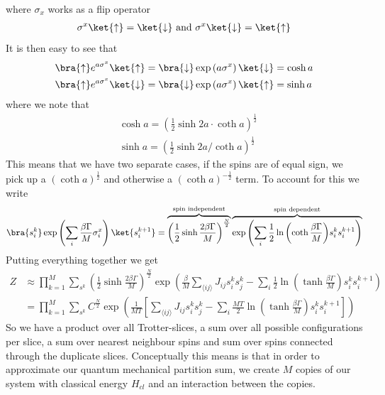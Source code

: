 where $\sigma_x$ works as a flip operator
\begin{align*}
    \sigma^x \ket{\uparrow} = \ket{\downarrow} \text{ and }
    \sigma^x \ket{\downarrow} = \ket{\uparrow}
\end{align*}
It is then easy to see that
\begin{align*}
    &\bra{\uparrow} e^{a\sigma^x} \ket{\uparrow} = \bra{\downarrow} \exp\left({a\sigma^x}\right) \ket{\downarrow} = \cosh{a} \\
    &\bra{\uparrow} e^{a\sigma^x} \ket{\downarrow} = \bra{\downarrow} \exp\left({a\sigma^x}\right) \ket{\uparrow} = \sinh{a}
\end{align*}
where we note that
\begin{align*}
    &\cosh{a} = \left(\frac{1}{2} \sinh{2a} \cdot \coth{a}\right)^{\frac{1}{2}}\\
    &\sinh{a} =  \left(\frac{1}{2} \sinh{2a} / \coth{a}\right)^{\frac{1}{2}}
\end{align*}
This means that we have two separate cases, if the spins are of equal sign, we pick up a $\left(\coth{a}\right)^{\frac{1}{2}}$ and otherwise a $\left(\coth{a}\right)^{-\frac{1}{2}}$ term. To account for this we write
\begin{eqnarray*}
    \bra{s^k_i} \exp\left(\sum_i \frac{\beta\Gamma}{M}\sigma_i^x\right) \ket{s^{k+1}_i} = \overbrace{\left(\frac{1}{2} \sinh{\frac{2\beta\Gamma}{M}}\right)^{\frac{N}{2}}}^{\text{spin independent}} \overbrace{\exp\left(\sum_i \frac{1}{2}\ln{\left(\coth{\frac{\beta\Gamma}{M}}\right)}s_i^k s_i^{k+1}\right)}^{\text{spin dependent}}
\end{eqnarray*}
Putting everything together we get 
\begin{align}
    Z &\approx \prod_{k=1}^M \sum_{s^k} \left(\frac{1}{2} \sinh{\frac{2\beta\Gamma}{M}}\right)^{\frac{N}{2}} \exp\left(\frac{\beta}{M}\sum_{\langle ij \rangle} J_{ij} s_i^k s_j^k - \sum_i\frac{1}{2}\ln{\left(\tanh{\frac{\beta\Gamma}{M}}\right)}s_i^k s_i^{k+1}\right)\nonumber\\
    &= \prod_{k=1}^M \sum_{s^k}C^{\frac{N}{2}} \exp\left(\frac{1}{MT}\left[\sum_{\langle ij \rangle} J_{ij} s_i^k s_j^k - \sum_i\frac{MT}{2}\ln{\left(\tanh\frac{\beta\Gamma}{M}\right)}s_i^k s_i^{k+1}\right]\right)\label{eq:trotter_part}
\end{align}
So we have a product over all Trotter-slices, a sum over all possible configurations per slice, a sum over nearest neighbour spins and sum over spins connected through the duplicate slices. Conceptually this means is that in order to approximate our quantum mechanical partition sum, we create $M$ copies of our system with classical energy $H_{cl}$ and an interaction between the copies. \newline 
